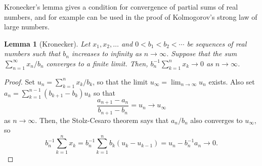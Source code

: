\documentclass[12pt]{article}
\newtheorem*{lemma*}{Lemma}
\begin{document}
Kronecker's lemma gives a condition for convergence of partial sums of real numbers, and for example can be used in the proof of Kolmogorov's strong law of large numbers.

\begin{lemma*}[Kronecker]
Let $x_1,x_2,\ldots$ and $0<b_1<b_2<\cdots$ be sequences of real numbers such that $b_n$ increases to infinity as $n\rightarrow\infty$. Suppose that the sum $\sum_{n=1}^\infty x_n/b_n$ converges to a finite limit. Then, $b_n^{-1}\sum_{k=1}^nx_k\rightarrow 0$ as $n\rightarrow\infty$.  
\end{lemma*}
\begin{proof}
Set $u_n=\sum_{k=1}^nx_k/b_k$, so that the limit $u_\infty=\lim_{n\rightarrow\infty}u_n$ exists.
Also set $a_n=\sum_{k=1}^{n-1}(b_{k+1}-b_k)u_k$ so that
\begin{equation*}
\frac{a_{n+1}-a_n}{b_{n+1}-b_n}=u_n\rightarrow u_\infty
\end{equation*}
as $n\rightarrow\infty$. Then, the Stolz-Cesaro theorem says that $a_n/b_n$ also converges to $u_\infty$, so
\begin{equation*}
b_n^{-1}\sum_{k=1}^nx_k=b_n^{-1}\sum_{k=1}^nb_k(u_k-u_{k-1})=u_n-b_n^{-1}a_n\rightarrow 0.
\end{equation*}
\end{proof}

\end{document}
